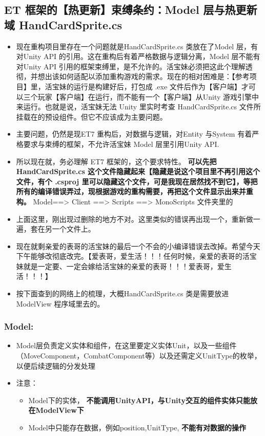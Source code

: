 \documentclass[9pt, b5paper]{article}
\begin{document}
\subsection{ET 框架的【热更新】束缚条约：Model 层与热更新域 HandCardSprite.cs}
\label{sec:orga084375}
\begin{itemize}
\item 现在重构项目里存在一个问题就是HandCardSprite.cs 类放在了Model 层，有对Unity API 的引用。这在重构后有着严格数据与逻辑分离，Model 层不能有对Unity API 引用的框架束缚里，是不允许的。活宝妹必须把这此个理解透彻，并想出该如何适配以添加重构游戏的需求。现在的相对困难是：【参考项目】里，活宝妹的运行是构建好后，打包成 .exe 文件后作为【客户端】才可以三个玩家【客户端】在运行，而不能有一个【客户端】从Unity 游戏引擎中来运行。也就是说，活宝妹无法 Unity 里实时考查 HandCardSprite.cs 文件所挂载在的预设组件。但它不应该成为主要问题。
\item 主要问题，仍然是现ET7 重构后，对数据与逻辑，对Entity 与System 有着严格要求与束缚的框架，不允许活宝妹 Model 层里引用Unity API.
\item 所以现在就，务必理解 ET7 框架的，这个要求特性。 \textbf{可以先把HandCardSprite.cs 这个文件隐藏起来【隐藏是说这个项目里不再引用这个文件，有个 .csproj 里可以隐藏这个文件，可是我现在居然找不到它】，等把所有的编译错误弄过，现根据游戏的重构需要，再把这个文件显示出来并重构。} Model==> Client ==> Scripts ==> MonoScripts 文件夹里的
\item 上面这里，刚出现过删除的地方不对。这里类似的错误再出现一个，重新做一遍，套在另一个文件上。
\item 现在就剩亲爱的表哥的活宝妹的最后一个不会的小编译错误去改掉。希望今天下午能够改彻底改完。【爱表哥，爱生活！！！任何时候，亲爱的表哥的活宝妹就是一定要、一定会嫁给活宝妹的亲爱的表哥！！！爱表哥，爱生活！！！】
\item 按下面查到的网络上的梳理，大概HandCardSprite.cs 类是需要放进ModelView 程序域里去的。
\end{itemize}
\subsubsection{Model:}
\label{sec:org7e36e3f}
\begin{itemize}
\item Model层负责定义实体和组件，在这里要定义实体Unit，以及一些组件（MoveComponent，CombatComponent等）以及还需定义UnitType的枚举，以便后续逻辑的分发处理
\item 注意：
\begin{itemize}
\item Model下的实体， \textbf{不能调用UnityAPI，与Unity交互的组件实体只能放在ModelView下}
\item Model中只能存在数据，例如position,UnitType, \textbf{不能有对数据的操作}
\end{itemize}
\end{itemize}
\end{document}
